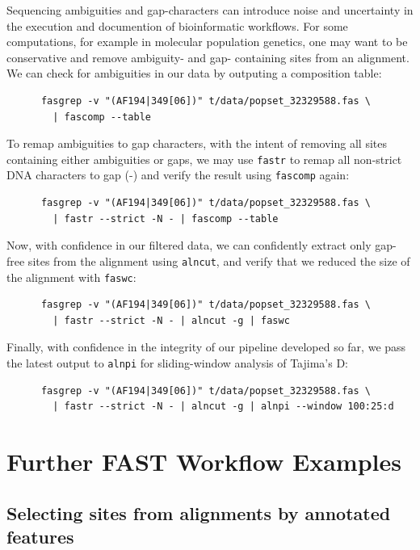 \documentclass{frontiersSCNS} %
\begin{document}
\noindent Sequencing ambiguities and gap-characters can introduce
noise and uncertainty in the execution and documention of
bioinformatic workflows. For some computations, for example in
molecular population genetics, one may want to be conservative and
remove ambiguity- and gap- containing sites from an alignment. We can
check for ambiguities in our data by outputing a composition table:
 
\begin{verbatim}
      fasgrep -v "(AF194|349[06])" t/data/popset_32329588.fas \ 
        | fascomp --table
\end{verbatim}

\noindent To remap ambiguities to gap characters, with the intent of
removing all sites containing either ambiguities or gaps, we may use
{\tt fastr} to remap all non-strict DNA characters to gap (-) and
verify the result using {\tt fascomp} again:
 
\begin{verbatim}
      fasgrep -v "(AF194|349[06])" t/data/popset_32329588.fas \
        | fastr --strict -N - | fascomp --table
\end{verbatim}

\noindent  Now, with confidence in our filtered data, we can confidently extract
only gap-free sites from the alignment using {\tt alncut}, and verify
that we reduced the size of the alignment with {\tt faswc}:

\begin{verbatim}
      fasgrep -v "(AF194|349[06])" t/data/popset_32329588.fas \
        | fastr --strict -N - | alncut -g | faswc
\end{verbatim}

\noindent Finally, with confidence in the integrity of our pipeline
developed so far, we pass the latest output to {\tt alnpi} for
sliding-window analysis of Tajima's D:
 
\begin{verbatim}
      fasgrep -v "(AF194|349[06])" t/data/popset_32329588.fas \
        | fastr --strict -N - | alncut -g | alnpi --window 100:25:d
\end{verbatim}

\section{Further FAST Workflow Examples}

\subsection{Selecting sites from alignments by annotated features }
\end{document}
